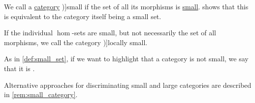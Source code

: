 \begin{definition}\label{def:small_category}
  We call a \hyperref[def:category]{category} \term[ru=малая категория (\cite[15]{ЦаленкоШульгейфер1974ОсновыТеорииКатегорий})]{small} if the set of all its morphisms is \hyperref[def:small_set]{small}.  shows that this is equivalent to the category itself being a small set.

  If the individual \( \hom \)-sets are small, but not necessarily the set of all morphisms, we call the category \term[ru=локально малая категория (\cite[26]{ЦаленкоШульгейфер1974ОсновыТеорииКатегорий})]{locally small}.

  As in \cref{def:small_set}, if we want to highlight that a category is not small, we say that it is .
\end{definition}
\begin{comments}
  \item Alternative approaches for discriminating small and large categories are described in \cref{rem:small_category}.
\end{comments}

